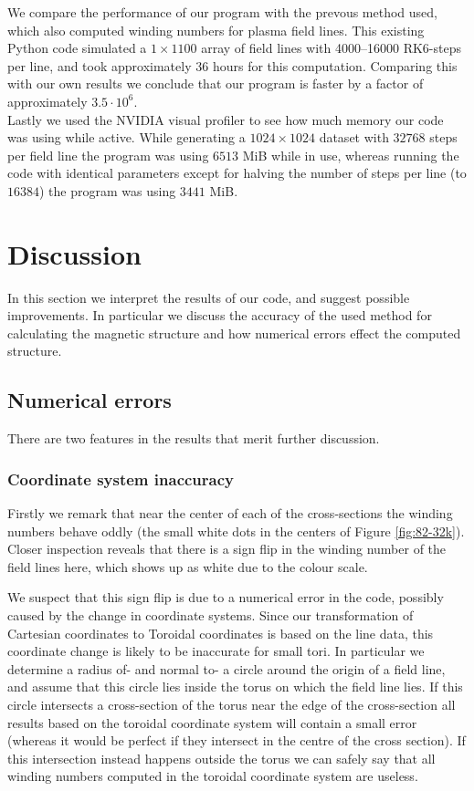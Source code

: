 \documentclass[a4paper]{article}
\begin{document}

We compare the performance of our program with the prevous method used, which also computed winding numbers for plasma field lines.
This existing Python code simulated a $1\times 1100$ array of field lines with 4000--16000 RK6-steps per line, and took approximately $36$ hours for this computation. 
Comparing this with our own results we conclude that our program is faster by a factor of approximately $3.5\cdot 10^6$.\\

Lastly we used the NVIDIA visual profiler to see how much memory our code was using while active. 
While generating a $1024\times 1024$ dataset with $32768$ steps per field line the program was using $6513$ MiB while in use, whereas running the code with identical parameters except for halving the number of steps per line (to $16384$) the program was using $3441$ MiB.


\section{Discussion}
In this section we interpret the results of our code, and suggest possible improvements. 
In particular we discuss the accuracy of the used method for calculating the magnetic structure and how numerical errors effect the computed structure.

\subsection{Numerical errors}\label{section:numerrors}
There are two features in the results that merit further discussion. 

\subsubsection{Coordinate system inaccuracy}
Firstly we remark that near the center of each of the cross-sections the winding numbers behave oddly (the small white dots in the centers of Figure \ref{fig:82-32k}).
Closer inspection reveals that there is a sign flip in the winding number of the field lines here, which shows up as white due to the colour scale. 

We suspect that this sign flip is due to a numerical error in the code, possibly caused by the change in coordinate systems. 
Since our transformation of Cartesian coordinates to Toroidal coordinates is based on the line data, this coordinate change is likely to be inaccurate for small tori. 
In particular we determine a radius of- and normal to- a circle around the origin of a field line, and assume that this circle lies inside the torus on which the field line lies. If this circle intersects a cross-section of the torus near the edge of the cross-section all results based on the toroidal coordinate system will contain a small error (whereas it would be perfect if they intersect in the centre of the cross section). 
If this intersection instead happens outside the torus we can safely say that all winding numbers computed in the toroidal coordinate system are useless. 
\end{document}
